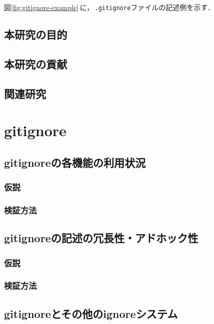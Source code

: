 \documentclass[a4paper,xelatex,ja=standard,fontsize=11pt]{bxjsreport}
\newcommand{\figref}[1]{図\ref{#1}\,}
\newcommand{\gitignore}{\,\texttt{.gitignore}ファイル}
\begin{document}
\figref{fig:gitignore-example}に，\gitignore{}の記述例を示す．

\section{本研究の目的}

\section{本研究の貢献}

\section{関連研究}

%
\chapter{\textrm{gitignore}}

\section{\textrm{gitignore}の各機能の利用状況}

\subsection{仮説}

\subsection{検証方法}

\section{\textrm{gitignore}の記述の冗長性・アドホック性}

\subsection{仮説}

\subsection{検証方法}

\section{\textrm{gitignore}とその他の\textrm{ignore}システム}
\end{document}
